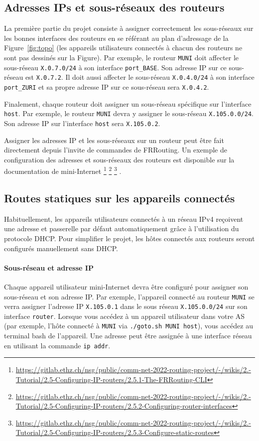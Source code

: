 \documentclass[a4paper, 11pt]{article}
\begin{document}
\subsection{Adresses IPs et sous-réseaux des routeurs}

La première partie du projet consiste à assigner correctement les
sous-réseaux sur les bonnes interfaces des routeurs en se référant au
plan d'adressage de la Figure~\ref{fig:topo} (les appareils utilisateurs
connectés à chacun des routeurs ne sont pas dessinés sur la Figure).
Par exemple, le routeur \texttt{MUNI} doit affecter le sous-réseau
\texttt{X.0.7.0/24} à son interface \texttt{port\_BASE}. Son adresse
IP sur ce sous-réseau est \texttt{X.0.7.2}. Il doit aussi affecter le
sous-réseau \texttt{X.0.4.0/24} à son interface \texttt{port\_ZURI} et
sa propre adresse IP sur ce sous-réseau sera \texttt{X.0.4.2}.

Finalement, chaque routeur doit assigner un sous-réseau spécifique sur
l'interface \texttt{host}. Par exemple,
le routeur \texttt{MUNI} devra y assigner le sous-réseau
\texttt{X.105.0.0/24}. Son adresse IP sur l'interface \texttt{host}
sera \texttt{X.105.0.2}.

Assigner les adresses IP et les sous-réseaux sur un routeur
peut être fait directement depuis l'invite de commandes
de FRRouting. Un exemple de configuration des adresses
et sous-réseaux des routeurs est disponible sur la
documentation de
mini-Internet
\footnote{\url{https://gitlab.ethz.ch/nsg/public/comm-net-2022-routing-project/-/wikis/2.-Tutorial/2.5-Configuring-IP-routers/2.5.1-The-FRRouting-CLI}}
\footnote{\url{https://gitlab.ethz.ch/nsg/public/comm-net-2022-routing-project/-/wikis/2.-Tutorial/2.5-Configuring-IP-routers/2.5.2-Configuring-router-interfaces}}
\footnote{\url{https://gitlab.ethz.ch/nsg/public/comm-net-2022-routing-project/-/wikis/2.-Tutorial/2.5-Configuring-IP-routers/2.5.3-Configure-static-routes}}
.
\subsection{Routes statiques sur les appareils connectés}

Habituellement, les appareils utilisateurs connectés à un réseau
IPv4 reçoivent une adresse et passerelle par défaut automatiquement
grâce à l'utilisation du protocole DHCP. Pour simplifier le projet,
les hôtes connectés aux routeurs seront configurés manuellement
sans DHCP. 

\paragraph*{Sous-réseau et adresse IP} 
Chaque appareil utilisateur mini-Internet devra
être configuré pour assigner son sous-réseau et son adresse IP.
Par exemple, l'appareil connecté au routeur \texttt{MUNI} se verra
assigner l'adresse IP \texttt{X.105.0.1} dans le sous réseau
\texttt{X.105.0.0/24} sur son interface \texttt{router}.
Lorsque vous accédez à un appareil utilisateur dans votre AS
(par exemple, l'hôte connecté à \texttt{MUNI} via
\texttt{./goto.sh MUNI host}), vous accédez au terminal
bash de l'appareil.
Une adresse peut être assignée à une interface réseau en utilisant
la commande \texttt{ip addr}.
\end{document}
